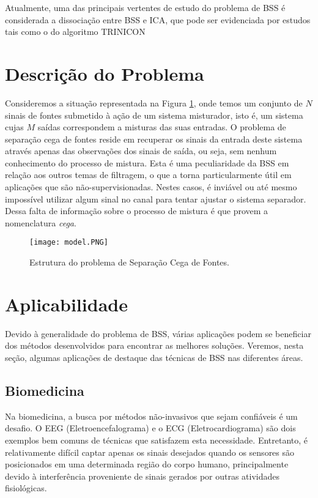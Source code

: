     
    Atualmente, uma das principais vertentes de estudo do problema de BSS é considerada a dissociação entre BSS e ICA, que pode ser evidenciada por estudos tais como o do algoritmo TRINICON \cite{trinicon}
    
\section{Descrição do Problema}
    
    Consideremos a situação representada na Figura \ref{fig:structure}, onde temos um conjunto de $N$ sinais de fontes submetido à ação de um sistema misturador, isto é, um sistema cujas $M$ saídas correspondem a misturas das suas entradas. O problema de separação cega de fontes reside em recuperar os sinais da entrada deste sistema através apenas das observações dos sinais de saída, ou seja, sem nenhum conhecimento do processo de mistura. Esta é uma peculiaridade da BSS em relação aos outros temas de filtragem, o que a torna particularmente útil em aplicações que são não-supervisionadas. Nestes casos, é inviável ou até mesmo impossível utilizar algum sinal no canal para tentar ajustar o sistema separador. Dessa falta de informação sobre o processo de mistura é que provem a nomenclatura \textit{cega}.
    
    \begin{figure}
       \hfill\texttt{[image: model.PNG]}\hspace*{\fill}
        \caption{Estrutura do problema de Separação Cega de Fontes.}
        \label{fig:structure}
    \end{figure}


\section{Aplicabilidade}
    Devido à generalidade do problema de BSS, várias aplicações podem se beneficiar dos métodos desenvolvidos para encontrar as melhores soluções. Veremos, nesta seção, algumas aplicações de destaque das técnicas de BSS nas diferentes áreas.
    
\subsection{Biomedicina}
    Na biomedicina, a busca por métodos não-invasivos que sejam confiáveis é um desafio. O EEG (Eletroencefalograma) e o ECG (Eletrocardiograma) são dois exemplos bem comuns de técnicas que satisfazem esta necessidade. Entretanto, é relativamente difícil captar apenas os sinais desejados quando os sensores são posicionados em uma determinada região do corpo humano, principalmente devido à interferência proveniente de sinais gerados por outras atividades fisiológicas.
       
